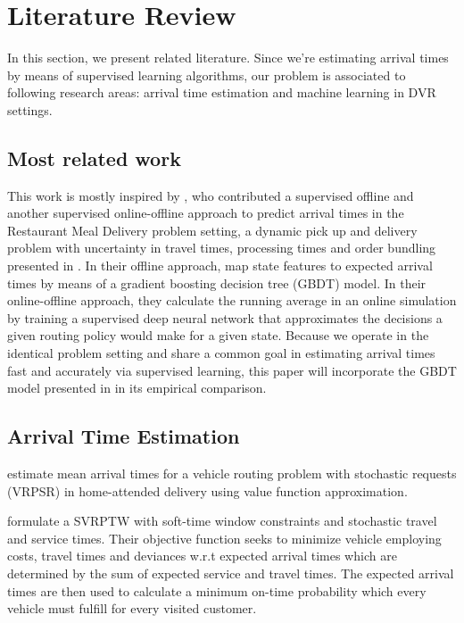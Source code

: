 \chapter{Literature Review}

In this section, we present related literature. Since we're estimating arrival times by means of supervised learning algorithms, our problem is associated to following research areas: arrival time estimation and machine learning in DVR settings. 


\section{Most related work}

This work is mostly inspired by \cite{Hildebrandt2020_EAT}, who contributed a supervised offline and another supervised online-offline approach to predict arrival times in the Restaurant Meal Delivery problem setting, a dynamic pick up and delivery problem with uncertainty in travel times, processing times and order bundling  presented in \cite{UlmerRMDP}. In their offline approach, \cite{Hildebrandt2020_EAT} map state features to expected arrival times by means of a gradient boosting decision tree (GBDT) model. In their online-offline approach, they calculate the running average in an online simulation by training a supervised deep neural network that approximates the decisions a given routing policy would make for a given state.
Because we operate in the identical problem setting and share a common goal in estimating arrival times fast and accurately via supervised learning, this paper will incorporate the GBDT model presented in \cite{Hildebrandt2020_EAT} in its empirical comparison. 

\section{Arrival Time Estimation}

\cite{UlmerBarrett2017_TWAP} estimate mean arrival times for a vehicle routing problem with stochastic requests (VRPSR) in home-attended delivery using value function approximation. 

\cite{Zhu2020_OFCTE}

   


\cite{Zhang2013} formulate a SVRPTW with soft-time window constraints and stochastic travel and service times. Their objective function seeks to minimize vehicle employing costs, travel times and deviances w.r.t expected arrival times which are determined by the sum of expected service and travel times. The expected arrival times are then used to calculate a minimum on-time probability which every vehicle must fulfill for every visited customer.  

